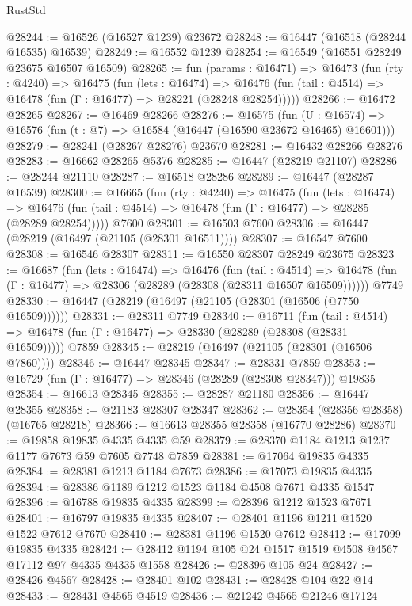 \begin{lexlean}{RustStd}
\begin{coremodule}
{\begin{coremodule}
{{{{{{{{{{{{{{{{{{{{{{{{{{{{{{{{{{{{{{{{{{{{{{{{{{{{{{{@28244 := @16526 (@16527 @1239) @23672
@28248 := @16447 (@16518 (@28244 @16535) @16539)
@28249 := @16552 @1239
@28254 := @16549 (@16551 @28249 @23675 @16507 @16509)
@28265 := fun (params : @16471) =>
  @16473
    (fun (rty : @4240) =>
    @16475
      (fun (lets : @16474) =>
      @16476 (fun (tail : @4514) => @16478 (fun (Γ : @16477) => @28221 (@28248 @28254)))))
@28266 := @16472 @28265
@28267 := @16469 @28266
@28276 := @16575
    (fun (U : @16574) => @16576 (fun (t : @7) => @16584 (@16447 (@16590 @23672 @16465) @16601)))
@28279 := @28241 (@28267 @28276) @23670
@28281 := @16432 @28266 @28276
@28283 := @16662 @28265 @5376
@28285 := @16447 (@28219 @21107)
@28286 := @28244 @21110
@28287 := @16518 @28286
@28289 := @16447 (@28287 @16539)
@28300 := @16665
    (fun (rty : @4240) =>
    @16475
      (fun (lets : @16474) =>
      @16476 (fun (tail : @4514) => @16478 (fun (Γ : @16477) => @28285 (@28289 @28254)))))
    @7600
@28301 := @16503 @7600
@28306 := @16447 (@28219 (@16497 (@21105 (@28301 @16511))))
@28307 := @16547 @7600
@28308 := @16546 @28307
@28311 := @16550 @28307 @28249 @23675
@28323 := @16687
    (fun (lets : @16474) =>
    @16476
      (fun (tail : @4514) =>
      @16478 (fun (Γ : @16477) => @28306 (@28289 (@28308 (@28311 @16507 @16509))))))
    @7749
@28330 := @16447 (@28219 (@16497 (@21105 (@28301 (@16506 (@7750 @16509))))))
@28331 := @28311 @7749
@28340 := @16711
    (fun (tail : @4514) => @16478 (fun (Γ : @16477) => @28330 (@28289 (@28308 (@28331 @16509)))))
    @7859
@28345 := @28219 (@16497 (@21105 (@28301 (@16506 @7860))))
@28346 := @16447 @28345
@28347 := @28331 @7859
@28353 := @16729 (fun (Γ : @16477) => @28346 (@28289 (@28308 @28347))) @19835
@28354 := @16613 @28345
@28355 := @28287 @21180
@28356 := @16447 @28355
@28358 := @21183 @28307 @28347
@28362 := @28354 (@28356 @28358) (@16765 @28218)
@28366 := @16613 @28355 @28358 (@16770 @28286)
@28370 := @19858 @19835 @4335 @4335 @59
@28379 := @28370 @1184 @1213 @1237 @1177 @7673 @59 @7605 @7748 @7859
@28381 := @17064 @19835 @4335
@28384 := @28381 @1213 @1184 @7673
@28386 := @17073 @19835 @4335
@28394 := @28386 @1189 @1212 @1523 @1184 @4508 @7671 @4335 @1547
@28396 := @16788 @19835 @4335
@28399 := @28396 @1212 @1523 @7671
@28401 := @16797 @19835 @4335
@28407 := @28401 @1196 @1211 @1520 @1522 @7612 @7670
@28410 := @28381 @1196 @1520 @7612
@28412 := @17099 @19835 @4335
@28424 := @28412 @1194 @105 @24 @1517 @1519 @4508 @4567 @17112 @97 @4335 @4335 @1558
@28426 := @28396 @105 @24
@28427 := @28426 @4567
@28428 := @28401 @102
@28431 := @28428 @104 @22 @14
@28433 := @28431 @4565 @4519
@28436 := @21242 @4565 @21246 @17124
}}}}}}}}}}}}}}}}}}}}}}}}}}}}}}}}}}}}}}}}}}}}}}}}}}}}}}}
\end{coremodule}}
\end{coremodule}
\end{lexlean}
